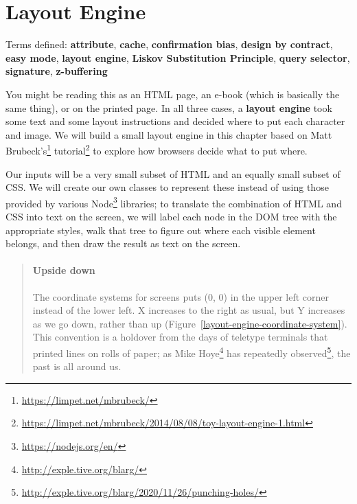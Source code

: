 \documentclass[krantzl]{krantz}
\newcommand{\figref}[1]{Figure~\ref{#1}}
\newcommand{\glossref}[1]{\textbf{#1}}
\newenvironment{callout}{\savenotes\begin{tBox}\begin{quotation}\toggletrue{inbox}\renewcommand{\thempfootnote}{\arabic{footnote}}}{\end{quotation}\vspace{\baselineskip}\end{tBox}\togglefalse{inbox}\spewnotes}
\newcommand{\hreffoot}[2]{{#1}\footnote{\href{#2}{#2}}}
\begin{document}
\chapter{Layout Engine}\label{layout-engine}


\noindent 
  Terms defined: \glossref{attribute}, \glossref{cache}, \glossref{confirmation bias}, \glossref{design by contract}, \glossref{easy mode}, \glossref{layout engine}, \glossref{Liskov Substitution Principle}, \glossref{query selector}, \glossref{signature}, \glossref{z-buffering}



You might be reading this as an HTML page,
an e-book (which is basically the same thing),
or on the printed page.
In all three cases,
a \glossref{layout engine} took some text and some layout instructions
and decided where to put each character and image.
We will build a small layout engine in this chapter
based on \hreffoot{Matt Brubeck’s}{https://limpet.net/mbrubeck/} \hreffoot{tutorial}{https://limpet.net/mbrubeck/2014/08/08/toy-layout-engine-1.html}
to explore how browsers decide what to put where.


Our inputs will be a very small subset of HTML and an equally small subset of CSS.
We will create our own classes to represent these
instead of using those provided by various \hreffoot{Node}{https://nodejs.org/en/} libraries;
to translate the combination of HTML and CSS into text on the screen,
we will label each node in the DOM tree with the appropriate styles,
walk that tree to figure out where each visible element belongs,
and then draw the result as text on the screen.

\begin{callout}


\subsubsection*{Upside down}


The coordinate systems for screens
puts (0, 0) in the upper left corner instead of the lower left.
X increases to the right as usual,
but Y increases as we go down, rather than up
(\figref{layout-engine-coordinate-system}).
This convention is a holdover from the days of teletype terminals
that printed lines on rolls of paper;
as \hreffoot{Mike Hoye}{http://exple.tive.org/blarg/} has \hreffoot{repeatedly observed}{http://exple.tive.org/blarg/2020/11/26/punching-holes/},
the past is all around us.

\end{callout}
\end{document}
